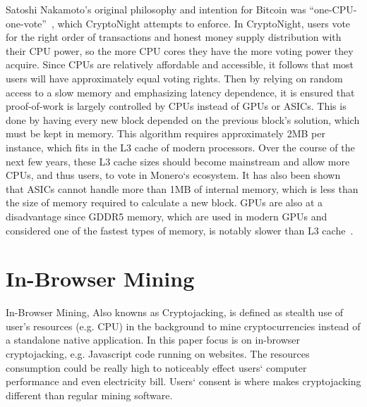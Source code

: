 Satoshi Nakamoto’s original philosophy and intention for Bitcoin was “one-CPU-one-vote”~\cite{nakamoto2008bitcoin}, which CryptoNight attempts to enforce. In CryptoNight, users vote for the right order of transactions and honest money supply distribution with their CPU power, so the more CPU cores they have the more voting power they acquire. Since CPUs are relatively affordable and accessible, it follows that most users will have approximately equal voting rights. Then by relying on random access to a slow memory and emphasizing latency dependence, it is ensured that proof-of-work is largely controlled by CPUs instead of GPUs or ASICs. This is done by having every new block depended on the previous block’s solution, which must be kept in memory. This algorithm requires approximately 2MB per instance, which fits in the L3 cache of modern processors. Over the course of the next few years, these L3 cache sizes should become mainstream and allow more CPUs, and thus users, to vote in Monero`s ecosystem. It has also been shown that ASICs cannot handle more than 1MB of internal memory, which is less than the size of memory required to calculate a new block. GPUs are also at a disadvantage since GDDR5 memory, which are used in modern GPUs and considered one of the fastest types of memory, is notably slower than L3 cache~\cite{van2013cryptonote}.  

\section{In-Browser Mining}
In-Browser Mining, Also knowns as Cryptojacking, is defined as stealth use of user's resources (e.g. CPU) in the background to mine cryptocurrencies instead of a standalone native application. In this paper focus is on in-browser cryptojacking, e.g. Javascript code running on websites. The resources consumption could be really high to noticeably effect users` computer performance and even electricity bill. Users` consent is where makes cryptojacking different than regular mining software.

